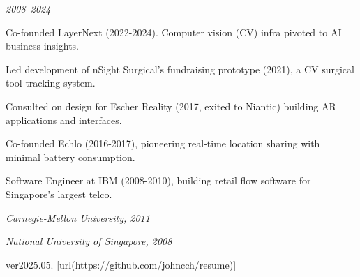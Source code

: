 \stopsectionlevel

\startsectionlevel[title={Additional
Experience},reference={additional-experience}]

{\em 2008--2024}

\startitemize[packed]
\item
  Co-founded LayerNext (2022-2024). Computer vision (CV) infra pivoted
  to AI business insights.
\item
  Led development of nSight Surgical's fundraising prototype (2021), a
  CV surgical tool tracking system.
\item
  Consulted on design for Escher Reality (2017, exited to Niantic)
  building AR applications and interfaces.
\item
  Co-founded Echlo (2016-2017), pioneering real-time location sharing
  with minimal battery consumption.
\item
  Software Engineer at IBM (2008-2010), building retail flow software
  for Singapore's largest telco.
\stopitemize

\stopsectionlevel

\stopsectionlevel

\startsectionlevel[title={Education},reference={education}]

\startsectionlevel[title={Masters in Human-Computer
Interaction},reference={masters-in-human-computer-interaction}]

{\em Carnegie-Mellon University, 2011}

\stopsectionlevel

\startsectionlevel[title={B.Eng (Hons.) in Electrical
Engineering},reference={b.eng-hons.-in-electrical-engineering}]

{\em National University of Singapore, 2008}

ver2025.05. [url(https://github.com/johncch/resume)]
\stopsectionlevel

\stopsectionlevel
